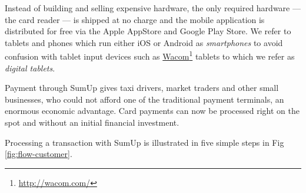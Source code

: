 \documentclass[a4paper, oneside]{csthesis}
\newcommand\fnurl[2]{%
  \href{#2}{#1}\footnote{\url{#2}}%
}
\begin{document}
Instead of building and selling expensive hardware, the only required hardware --- the card reader --- is shipped at no charge and the mobile application is distributed for free via the Apple AppStore and Google Play Store. We refer to tablets and phones which run either iOS or Android as \emph{smartphones} to avoid confusion with tablet input devices such as \fnurl{Wacom}{http://wacom.com/} tablets to which we refer as \emph{digital tablets}.

Payment through SumUp gives taxi drivers, market traders and other small businesses, who could not afford one of the traditional payment terminals, an enormous economic advantage. Card payments can now be processed right on the spot and without an initial financial investment.


Processing a transaction with SumUp is illustrated in five simple steps in Fig \ref{fig:flow-customer}.
\end{document}
